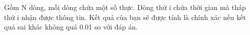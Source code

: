 Gồm N dòng, mỗi dòng chứa một số thực. Dòng thứ i chứa thời gian mà tháp thứ i nhận được thông tin. Kết quả của bạn sẽ được tính là chính xác nếu kết quả sai khác không quá 0.01 so với đáp án.